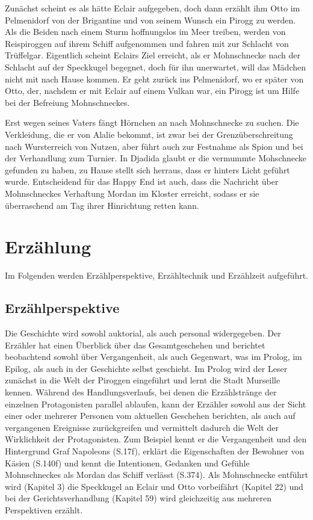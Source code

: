 Zunächst scheint es als hätte Eclair aufgegeben, doch dann erzählt ihm Otto im Pelmenidorf von der Brigantine und von seinem Wunsch ein Pirogg zu werden. Als die Beiden nach einem Sturm hoffnungslos im Meer treiben, werden von Reispiroggen auf ihrem Schiff aufgenommen und fahren mit zur Schlacht von Trüffelgar. Eigentlich scheint Eclairs Ziel erreicht, als er Mohnschnecke nach der Schlacht auf der Speckkugel begegnet, doch für ihn unerwartet, will das Mädchen nicht mit nach Hause kommen. Er geht zurück ins Pelmenidorf, wo er später von Otto, der, nachdem er mit Eclair auf einem Vulkan war, ein Pirogg ist um Hilfe bei der Befreiung Mohnschneckes.

Erst wegen seines Vaters fängt Hörnchen an nach Mohnschnecke zu suchen. Die Verkleidung, die er von Alalie bekommt, ist zwar bei der Grenzüberschreitung nach Wursterreich von Nutzen, aber führt auch zur Festnahme als Spion und bei der Verhandlung zum Turnier. In Djadida glaubt er die vermummte Mohschnecke gefunden zu haben, zu Hause stellt sich herraus, dass er hinters Licht geführt wurde. 
Entscheidend für das Happy End ist auch, dass die Nachricht über Mohnschneckes Verhaftung Mordan im Kloster erreicht, sodass er sie überraschend am Tag ihrer Hinrichtung retten kann.


\section{Erzählung}
Im Folgenden werden Erzählperspektive, Erzähltechnik und Erzählzeit aufgeführt.
\subsection{Erzählperspektive}

Die Geschichte wird sowohl auktorial, als auch personal widergegeben. Der Erzähler hat einen Überblick über das Gesamtgeschehen und berichtet  beobachtend sowohl über Vergangenheit, als auch Gegenwart, was im Prolog, im Epilog, als auch in der Geschichte selbst geschieht. 
Im Prolog wird der Leser zunächst in die Welt der Piroggen eingeführt und lernt die Stadt Murseille kennen. Während des Handlungsverlaufs, bei denen die Erzählstränge der einzelnen Protagonisten parallel ablaufen, kann der Erzähler sowohl aus der Sicht einer oder mehrerer Personen vom aktuellen Geschehen berichten, als auch auf vergangenen Ereignisse zurückgreifen und vermittelt dadurch die Welt der Wirklichkeit der Protagonisten. Zum Beispiel kennt er die Vergangenheit und den Hintergrund Graf Napoleons (S.17f), erklärt die Eigenschaften der Bewohner von Käsien (S.140f) und kennt die Intentionen, Gedanken und Gefühle Mohnschneckes als Mordan das Schiff verlässt (S.374). Als Mohnschnecke entführt wird (Kapitel 3) die Speckkugel an Eclair und Otto vorbeifährt (Kapitel 22) und bei der Gerichtsverhandlung (Kapitel 59) wird gleichzeitig aus mehreren Perspektiven erzählt.



